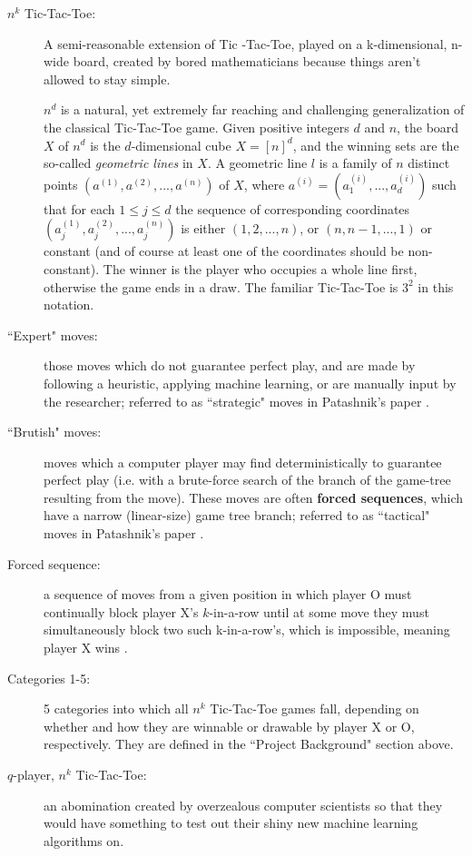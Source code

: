 \documentclass[english, 11pt]{article}
\begin{document}
\begin{description}
	\item [$n^k$ Tic-Tac-Toe:] A semi-reasonable extension of Tic -Tac-Toe, played on a k-dimensional, n-wide board, created by bored mathematicians because things aren’t allowed to stay simple. 
	\begin{displayquote}
		 $n^d$ is a natural, yet extremely far reaching and challenging generalization of the classical Tic-Tac-Toe game. Given positive integers $d$ and $n$, the board $X$ of $n^d$ is the $d$-dimensional cube $X = [n]^d$, and the winning sets
		are the so-called \textit{geometric lines} in $X$. A geometric line $l$ is a family of $n$ distinct points
		$(a^{(1)}, a^{(2)}, . . . , a^{(n)})$ of $X$, where $a^(i) = (a_1^{(i)}, ..., a_d^{(i)})$ such that for each $1 \leq j \leq d$ the sequence of corresponding coordinates $(a_j^{(1)}, a_j^{(2)}, . . . , a_j^{(n)})$ is either $(1,2,...,n)$, or $(n, n-1, ..., 1)$ or constant (and of course at least one of the coordinates should be non-constant). The winner is the player who occupies a whole line first, otherwise the game ends in a draw. The familiar Tic-Tac-Toe is $3^2$ in this notation. \cite{krivelevick}
	\end{displayquote}
	\item [``Expert" moves:] those moves which do not guarantee perfect play, and are made by following a heuristic, applying machine learning, or are manually input by the researcher; referred to as ``strategic" moves in Patashnik's paper \cite{patash}.
	\item [``Brutish" moves:] moves which a computer player may find deterministically to guarantee perfect play (i.e. with a brute-force search of the branch of the game-tree resulting from the move). These moves are often \textbf{forced sequences}, which have a narrow (linear-size) game tree branch; referred to as ``tactical" moves in Patashnik's paper \cite{patash}.
	\item [Forced sequence: ] a sequence of moves from a given position in which player O must continually block player X’s $k$-in-a-row until at some move they must simultaneously block two such k-in-a-row’s, which is impossible, meaning player X wins \cite{patash}.
	\item [Categories 1-5:] 5 categories into which all $n^k$ Tic-Tac-Toe games fall, depending on whether and how they are winnable or drawable by player X or O, respectively. They are defined in the ``Project Background" section above.
	\item [$q$-player, $n^k$ Tic-Tac-Toe:] an abomination created by overzealous computer scientists so that they would have something to test out their shiny new machine learning algorithms on. 	

\end{description}
\end{document}
